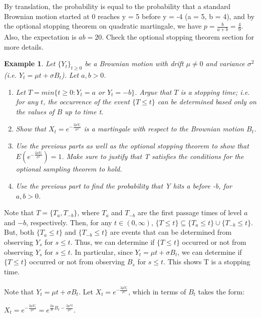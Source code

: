 \documentclass[12pt]{article}
\newtheorem{example}{Example}
\begin{document}
\noindent By translation, the probability is equal to the probability that a standard Brownian motion started at 0 reaches y = 5 before y = -4 (a = 5, b = 4), and by the optional stopping theorem on quadratic martingale, we have $p = \frac{b}{a+b} = \frac{4}{9}$. Also, the expectation is $ab = 20$. Check the optional stopping theorem section for more details.

\begin{example}
    Let $\{Y_t\}_{t \geq 0}$ be a Brownian motion with drift $\mu \neq 0$ and variance $\sigma^2$ (i.e. $Y_t = \mu t + \sigma B_t$). Let $a, b > 0$.
    \begin{enumerate}
        \item Let $T = min\{t \geq 0: Y_t = a$ or $Y_t = -b \}$. Argue that $T$ is a stopping time; i.e. for any $t$, the occurrence of the event $\{T \leq t\}$ can be determined based only on the values of $B$ up to time t.
        \item Show that $X_t = e^{-\frac{2\mu Y_t}{\sigma^2}}$ is a martingale with respect to the Brownian motion $B_t$.
        \item Use the previous parts as well as the optional stopping theorem to show that $E(e^{-\frac{2\mu Y_t}{\sigma^2}}) = 1$. Make sure to justify that T satisfies the conditions for the optional sampling theorem to hold.
        \item Use the previous part to find the probability that Y hits a before -b, for $a, b > 0$.
    \end{enumerate}
\end{example}
\noindent Note that $T = \{T_a, T_{-b}\}$, where $T_a$ and $T_{-b}$ are the first passage times of level $a$ and $-b$, respectively. Then, for any $t \in (0, \infty)$, $\{T \leq t\} \subseteq \{T_a \leq t\} \cup \{T_{-b} \leq t\}$. But, both $\{T_a \leq t\}$ and $\{T_{-b} \leq t\}$ are events that can be determined from observing $Y_s$ for $s \leq t$. Thus, we can determine if $\{T \leq t\}$ occurred or not from observing $Y_s$ for $s \leq t$. In particular, since $Y_t = \mu t + \sigma B_t$, we can determine if $\{T \leq t\}$ occurred or not from observing $B_s$ for $s \leq t$. This shows T is a stopping time.
\\
\\Note that $Y_t = \mu t + \sigma B_t$. Let $X_t = e^{-\frac{2\mu Y_t}{\sigma^2}}$, which in terms of $B_t$ takes the form:
\begin{center}
    $X_t = e^{-\frac{2\mu Y_t}{\sigma^2}} = e^{\frac{2\mu}{\sigma}B_t-\frac{2\mu ^2 t}{\sigma^2}}$.
\end{center}
\end{document}
